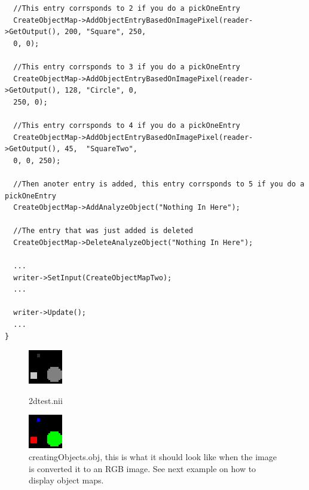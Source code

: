 \documentclass{InsightArticle}
\begin{document}
\begin{itemize}
\begin{verbatim}
  //This entry corrsponds to 2 if you do a pickOneEntry
  CreateObjectMap->AddObjectEntryBasedOnImagePixel(reader->GetOutput(), 200, "Square", 250,
  0, 0);

  //This entry corrsponds to 3 if you do a pickOneEntry
  CreateObjectMap->AddObjectEntryBasedOnImagePixel(reader->GetOutput(), 128, "Circle", 0,
  250, 0);

  //This entry corrsponds to 4 if you do a pickOneEntry
  CreateObjectMap->AddObjectEntryBasedOnImagePixel(reader->GetOutput(), 45,  "SquareTwo",
  0, 0, 250);

  //Then anoter entry is added, this entry corrsponds to 5 if you do a pickOneEntry
  CreateObjectMap->AddAnalyzeObject("Nothing In Here");

  //The entry that was just added is deleted
  CreateObjectMap->DeleteAnalyzeObject("Nothing In Here");
  
  ...
  writer->SetInput(CreateObjectMapTwo);
  ...
  
  writer->Update();
  ...
}
\end{verbatim} \normalsize

\begin{figure}[h]
  \hfill
  \begin{minipage}[t]{.45\textwidth}
    \begin{center}  
      \includegraphics[width=.28\textwidth]{2dtest.eps}
      \caption{2dtest.nii}
      \label{fig-tc}
    \end{center}
  \end{minipage}
  \hfill
  \begin{minipage}[t]{.45\textwidth}
    \begin{center}  
      \includegraphics[width=.28\textwidth]{creatingObject.eps}
      \caption{creatingObjects.obj, this is what it should look like when the image is converted it to an RGB image.  See next example on how to display 
    object maps.}
      \label{fig-tc}
    \end{center}
  \end{minipage}
  \hfill
\end{figure} 


\end{itemize}
\end{document}
